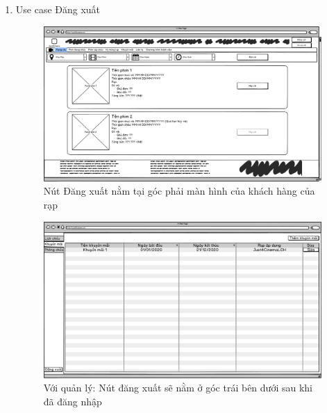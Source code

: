 \documentclass[a4paper, 12pt]{article}
\begin{document}
\begin{enumerate}
        \item Use case Đăng xuất
        \begin{figure}[H]
            \begin{center}
                \includegraphics[scale = 0.25]{Wireframe/User/Vé của tôi.png}
                \caption{Nút Đăng xuất nằm tại góc phải màn hình của khách hàng của rạp}
            \end{center}
        \end{figure}
        \begin{figure}[H]
            \begin{center}
                \includegraphics[scale = 0.25]{Wireframe/Manager/Quản lý_Dashboard_Khuyến mãi.png}
                \caption{Với quản lý: Nút đăng xuất sẽ nằm ở góc trái bên dưới sau khi đã đăng nhập}
            \end{center}
        \end{figure}
        \begin{figure}[H]
            \begin{center}

\end{center}
\end{figure}
\end{enumerate}
\end{document}
